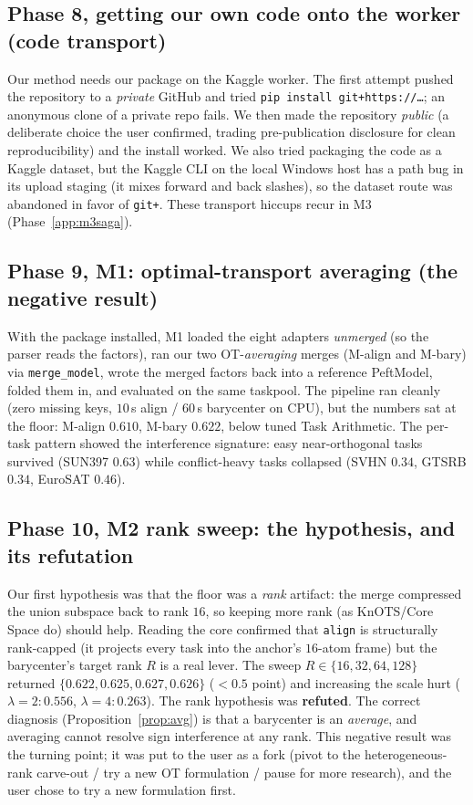 \documentclass[11pt]{article}
\begin{document}
\subsection{Phase 8, getting our own code onto the worker (code transport)}
\label{app:transport}
Our method needs our package on the Kaggle worker. The first attempt pushed the repository to a
\emph{private} GitHub and tried \texttt{pip install git+https://\dots}; an anonymous clone of a private
repo fails. We then made the repository \emph{public} (a deliberate choice the user confirmed, trading
pre-publication disclosure for clean reproducibility) and the install worked. We also tried packaging the
code as a Kaggle dataset, but the Kaggle CLI on the local Windows host has a path bug in its upload
staging (it mixes forward and back slashes), so the dataset route was abandoned in favor of
\texttt{git+}. These transport hiccups recur in M3 (Phase~\ref{app:m3saga}).

\subsection{Phase 9, M1: optimal-transport averaging (the negative result)}
\label{app:m1}
With the package installed, M1 loaded the eight adapters \emph{unmerged} (so the parser reads the
factors), ran our two OT-\emph{averaging} merges (M-align and M-bary) via \texttt{merge\_model}, wrote the
merged factors back into a reference PeftModel, folded them in, and evaluated on the same taskpool. The
pipeline ran cleanly (zero missing keys, $10$\,s align / $60$\,s barycenter on CPU), but the numbers sat
at the floor: M-align $0.610$, M-bary $0.622$, below tuned Task Arithmetic. The per-task pattern showed
the interference signature: easy near-orthogonal tasks survived (SUN397 $0.63$) while conflict-heavy tasks
collapsed (SVHN $0.34$, GTSRB $0.34$, EuroSAT $0.46$).

\subsection{Phase 10, M2 rank sweep: the hypothesis, and its refutation}
\label{app:m2rank}
Our first hypothesis was that the floor was a \emph{rank} artifact: the merge compressed the union
subspace back to rank $16$, so keeping more rank (as KnOTS/Core Space do) should help. Reading the core
confirmed that \texttt{align} is structurally rank-capped (it projects every task into the anchor's
$16$-atom frame) but the barycenter's target rank $R$ is a real lever. The sweep
$R\in\{16,32,64,128\}$ returned $\{0.622, 0.625, 0.627, 0.626\}$ ($<0.5$ point) and increasing the scale
hurt ($\lambda{=}2\!: 0.556$, $\lambda{=}4\!: 0.263$). The rank hypothesis was \textbf{refuted}. The
correct diagnosis (Proposition~\ref{prop:avg}) is that a barycenter is an \emph{average}, and averaging
cannot resolve sign interference at any rank. This negative result was the turning point; it was put to
the user as a fork (pivot to the heterogeneous-rank carve-out / try a new OT formulation / pause for more
research), and the user chose to try a new formulation first.
\end{document}
